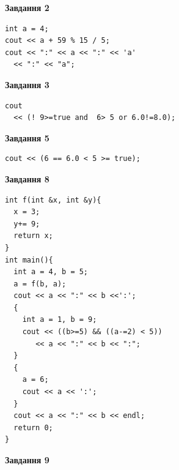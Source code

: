 \documentclass[12pt, ukrainian]{article}
\begin{document}
{\begin {large}
\begin{minipage}[t]{7.0cm}
\end{minipage}
\vline \hspace{1mm}
\begin{minipage}[t]{11.0cm}

\begin{center}
\textbf{Завдання 2}
\end{center}
\vspace{-8mm}

\begin{verbatim}
int a = 4;
cout << a + 59 % 15 / 5;
cout << ":" << a << ":" << 'a' 
  << ":" << "a";
\end{verbatim}



\begin{center}
\textbf{Завдання 3}
\end{center}
\vspace{-8mm}

\begin{verbatim}
cout 
  << (! 9>=true and  6> 5 or 6.0!=8.0);
\end{verbatim}



\begin{center}
\textbf{Завдання 5}
\end{center}
\vspace{-8mm}

\begin{verbatim}
cout << (6 == 6.0 < 5 >= true);
\end{verbatim}



\begin{center}
\textbf{Завдання 8}
\end{center}
\vspace{-8mm}

\begin{verbatim}
int f(int &x, int &y){
  x = 3;
  y+= 9;
  return x;
}
int main(){
  int a = 4, b = 5;
  a = f(b, a);
  cout << a << ":" << b <<':';
  {
    int a = 1, b = 9;
    cout << ((b>=5) && ((a-=2) < 5))
       << a << ":" << b << ":";
  }
  {
    a = 6;
    cout << a << ':';
  }
  cout << a << ":" << b << endl;
  return 0;
}
\end{verbatim}

\end{minipage}


\begin{minipage}[t]{7.0cm}

\begin{center}
\textbf{Завдання 9}
\end{center}
\vspace{-8mm}


\end{minipage}
\end{large}}
\end{document}
